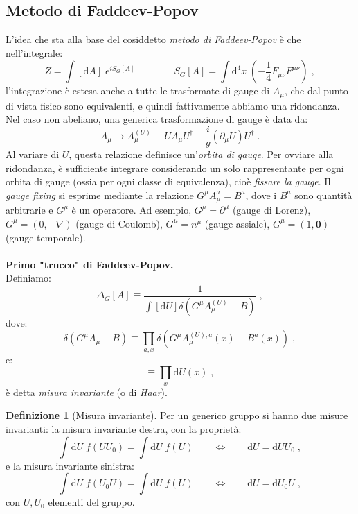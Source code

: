 \documentclass[12pt,a4paper]{article}
\theoremstyle{definition}
\newtheorem{dfn}{Definizione}[section]
\newcommand{\diff}[1][]{\mathrm{d}#1}
\newcommand{\adj}[1]{#1^{\dagger}}
\numberwithin{equation}{section}
\begin{document}
\subsection{Metodo di Faddeev-Popov}
L'idea che sta alla base del cosiddetto \emph{metodo di Faddeev-Popov} è che nell'integrale:
$$
Z=\int[\diff{A}]\;e^{iS_G[A]}\qquad\qquad S_G[A]=\int\diff^4{x}\;\left(-\frac{1}{4}F_{\mu\nu}F^{\mu\nu}\right)\;,
$$
l'integrazione è estesa anche a tutte le trasformate di gauge di $A_{\mu}$, che dal punto di vista fisico sono equivalenti, e quindi fattivamente abbiamo una ridondanza. Nel caso non abeliano, una generica trasformazione di gauge è data da:
\begin{equation}
A_{\mu}\longrightarrow A_{\mu}^{(U)}\equiv UA_{\mu}\adj{U}+\frac{i}{g}(\partial_{\mu}U)\adj{U}\;.
\end{equation}
Al variare di $U$, questa relazione definisce un'\emph{orbita di gauge}. Per ovviare alla ridondanza, è sufficiente integrare considerando un solo rappresentante per ogni orbita di gauge (ossia per ogni classe di equivalenza), cioè \emph{fissare la gauge}. Il \emph{gauge fixing} si esprime mediante la relazione $G^{\mu}A_{\mu}^a=B^a$, dove i $B^a$ sono quantità arbitrarie e $G^{\mu}$ è un operatore. Ad esempio, $G^{\mu}=\partial^{\mu}$ (gauge di Lorenz), $G^{\mu}=(0,-\nabla)$ (gauge di Coulomb), $G^{\mu}=n^{\mu}$ (gauge assiale), $G^{\mu}=(1,\mathbf{0})$ (gauge temporale). \\
\\
\textbf{Primo "trucco" di Faddeev-Popov.} \\
Definiamo:
\begin{equation}
\Delta_G[A]\equiv \frac{1}{\int[\diff{U}]\delta\left(G^{\mu}A_{\mu}^{(U)}-B\right)}\;,
\end{equation}
dove:
\begin{equation}
\delta\left(G^{\mu}A_{\mu}-B\right)\equiv\prod_{a,x}\delta\left(G^{\mu}A_{\mu}^{(U),a}(x)-B^a(x)\right)\;,
\end{equation}
e:
\begin{equation}
[\diff{U}]\equiv \prod_x\diff{U}(x)\;,
\end{equation}
è detta \emph{misura invariante} (o di \emph{Haar}).
\begin{dfn}[Misura invariante]
Per un generico gruppo si hanno due misure invarianti: la misura invariante destra, con la proprietà:
$$
\int\diff{U}\;f(UU_0)=\int\diff{U}\;f(U)\qquad \Longleftrightarrow\qquad \diff{U}=\diff{UU_0}\;,
$$
e la misura invariante sinistra:
$$
\int\diff{U}\;f(U_0U)=\int\diff{U}\;f(U)\qquad \Longleftrightarrow \qquad \diff{U}=\diff{U_0U}\;,
$$
con $U,U_0$ elementi del gruppo.
\end{dfn}
\end{document}
